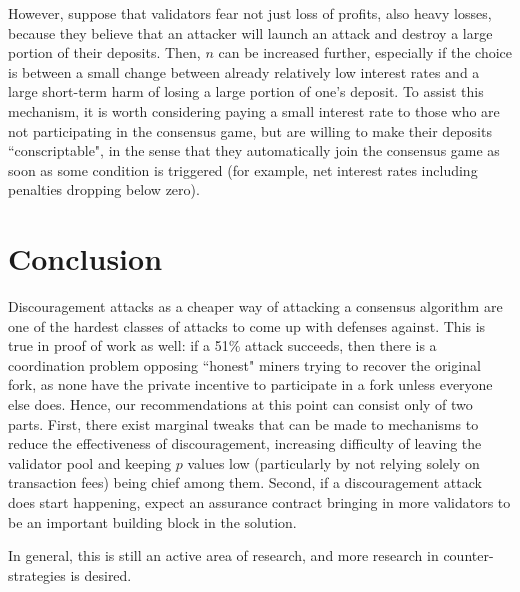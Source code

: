\documentclass[12pt]{article}
\begin{document}
However, suppose that validators fear not just loss of profits, also heavy losses, because they believe that an attacker will launch an attack and destroy a large portion of their deposits. Then, $n$ can be increased further, especially if the choice is between a small change between already relatively low interest rates and a large short-term harm of losing a large portion of one's deposit. To assist this mechanism, it is worth considering paying a small interest rate to those who are not participating in the consensus game, but are willing to make their deposits ``conscriptable", in the sense that they automatically join the consensus game as soon as some condition is triggered (for example, net interest rates including penalties dropping below zero).


\section{Conclusion}

Discouragement attacks as a cheaper way of attacking a consensus algorithm are one of the hardest classes of attacks to come up with defenses against. This is true in proof of work as well: if a 51\% attack succeeds, then there is a coordination problem opposing ``honest" miners trying to recover the original fork, as none have the private incentive to participate in a fork unless everyone else does. Hence, our recommendations at this point can consist only of two parts. First, there exist marginal tweaks that can be made to mechanisms to reduce the effectiveness of discouragement, increasing difficulty of leaving the validator pool and keeping $p$ values low (particularly by not relying solely on transaction fees) being chief among them. Second, if a discouragement attack does start happening, expect an assurance contract bringing in more validators to be an important building block in the solution.

In general, this is still an active area of research, and more research in counter-strategies is desired.



\end{document}
